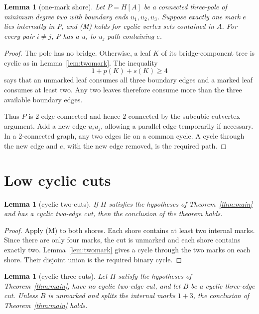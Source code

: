 \documentclass[11pt]{article}
\newtheorem{lemma}[theorem]{Lemma}
\theoremstyle{definition}
\theoremstyle{remark}
\begin{document}
\begin{lemma}[one-mark shore]\label{lem:onemark}
Let \(P=H[A]\) be a connected three-pole of minimum degree two with
boundary ends \(u_1,u_2,u_3\).  Suppose exactly one mark \(e\) lies
internally in \(P\), and (M) holds for cyclic vertex sets contained in
\(A\).  For every pair \(i\ne j\), \(P\) has a
\(u_i\)-to-\(u_j\) path containing \(e\).
\end{lemma}

\begin{proof}
The pole has no bridge.  Otherwise, a leaf \(K\) of its
bridge-component tree is cyclic as in Lemma~\ref{lem:twomark}.  The
inequality
\[
 1+p(K)+s(K)\ge4
\]
says that an unmarked leaf consumes all three boundary edges and a
marked leaf consumes at least two.  Any two leaves therefore consume
more than the three available boundary edges.

Thus \(P\) is \(2\)-edge-connected and hence \(2\)-connected by the
subcubic cutvertex argument.  Add a new edge \(u_i u_j\), allowing a
parallel edge temporarily if necessary.  In a \(2\)-connected graph,
any two edges lie on a common cycle.  A cycle through the new edge and
\(e\), with the new edge removed, is the required path.
\end{proof}

\section{Low cyclic cuts}

\begin{lemma}[cyclic two-cuts]\label{lem:twocut}
If \(H\) satisfies the hypotheses of Theorem~\ref{thm:main} and has a
cyclic two-edge cut, then the conclusion of the theorem holds.
\end{lemma}

\begin{proof}
Apply (M) to both shores.  Each shore contains at least two internal
marks.  Since there are only four marks, the cut is unmarked and each
shore contains exactly two.  Lemma~\ref{lem:twomark} gives a cycle
through the two marks on each shore.  Their disjoint union is the
required binary cycle.
\end{proof}

\begin{lemma}[cyclic three-cuts]\label{lem:threecut}
Let \(H\) satisfy the hypotheses of Theorem~\ref{thm:main}, have no
cyclic two-edge cut, and let \(B\) be a cyclic three-edge cut.
Unless \(B\) is unmarked and splits the internal marks \(1+3\), the
conclusion of Theorem~\ref{thm:main} holds.
\end{lemma}
\end{document}
